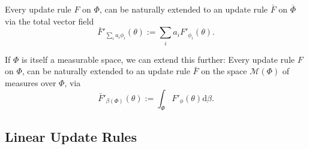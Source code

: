 \documentclass{article}
\newcommand{\ext}[1]{\overline #1} %
\begin{document}
\begin{prop}
    Every  update rule $F$ on $\Phi$, can be naturally extended to an update rule
    $\bar F$ on $\ext\Phi$
    via the total vector field
    \[
        \bar F'_{\textstyle\sum_i a_i \phi_i} ( \theta ) := \sum_{i} a_i F'_{\phi_i}(\theta).
    \]
%
\end{prop}

If $\Phi$ is itself a measurable space, we can extend this further:
Every  update rule $F$ on $\Phi$, can be naturally extended to an update rule $\bar F$ on the space $\mathcal M(\Phi)$ of measures over $\Phi$, via
\[
    \bar F'_{\beta(\Phi)}( \theta ) := \int_{\Phi} F'_\phi(\theta) \mathrm d\beta.
\]



% 
% 

% 
% 
\subsection{Linear Update Rules}

\end{document}
